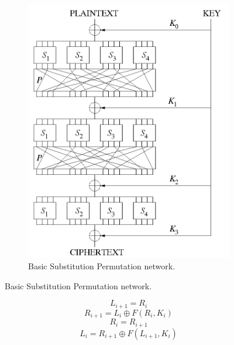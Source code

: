 \documentclass[12pt,twoside,a4paper]{report}
\begin{document}
\begin{figure}[H]
\begin{subfigure}[H]{0.5\textwidth}
            \includegraphics[width=\textwidth]{SP}
            \centering
            \caption{Basic Substitution Permutation network.}
            \label{SP}
    \end{subfigure}
    \end{figure}


	\begin{equation}
	\label{F_L_ENC}
	L_{i+1} = R_i
	\end{equation}
	\begin{equation}
	\label{F_R_ENC}
	R_{i+1} = L_i \oplus F(R_i, K_i)
	\end{equation}
	\begin{equation}
	\label{F_L_DEC}
	R_i = R_{i+1}
	\end{equation}
	\begin{equation}
	\label{F_R_DEC}
	L_i = R_{i+1} \oplus F(L_{i+1}, K_i)
	\end{equation}
    
\end{document}

